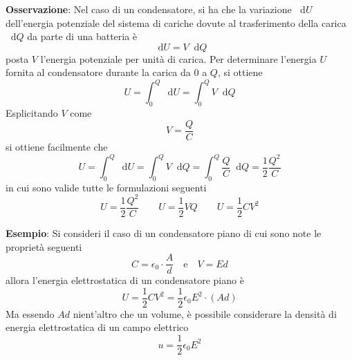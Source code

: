 \documentclass[a4paper]{extarticle}
\newcommand\dif{\mathop{}\!\mathrm{d}}
\begin{document}
\vspace{1em}
\noindent
\textbf{Osservazione}: Nel caso di un condensatore, si ha che la variazione $\dif U$ dell'energia potenziale del sistema di cariche dovute al trasferimento della carica $\dif Q$ da parte di una batteria è
\[\dif U = V \dif Q\]
posta $V$ l'energia potenziale per unità di carica. Per determinare l'energia $U$ fornita al condensatore durante la carica da $0$ a $Q$, si ottiene
\[U = \int_0^Q \dif U = \int_0^Q V \dif Q\]
Esplicitando $V$ come
\[V=\frac{Q}{C}\]
si ottiene facilmente che
\[U = \int_0^Q \dif U = \int_0^Q V \dif Q = \int_0^Q \frac{Q}{C} \dif Q = \frac{1}{2}\frac{Q^2}{C}\]
in cui sono valide tutte le formulazioni seguenti
\[U=\frac{1}{2}\frac{Q^2}{C} \hspace{2em} U = \frac{1}{2}VQ \hspace{2em} U=\frac{1}{2}CV^2\]

\vspace{1em}
\noindent
\textbf{Esempio}: Si consideri il caso di un condensatore piano di cui sono note le proprietà seguenti
\[C=\epsilon_0 \cdot \frac{A}{d} \hspace{1em} \text{e} \hspace{1em} V = Ed\]
allora l'energia elettrostatica di un condensatore piano è
\[U=\frac{1}{2}CV^2=\frac{1}{2} \epsilon_0 E^2 \cdot (Ad)\]
Ma essendo $Ad$ nient'altro che un volume, è possibile considerare la densità di energia elettrostatica di un campo elettrico
\[\boxed{u=\frac{1}{2} \epsilon_0 E^2}\]
\end{document}
